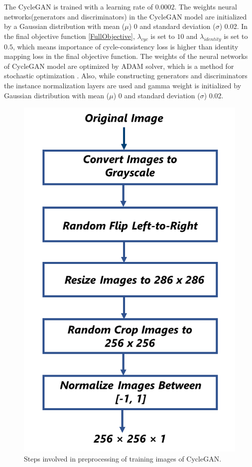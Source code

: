 The \ac{CycleGAN} is trained with a learning rate of $0.0002$. The weights neural networks(generators and discriminators) in the \ac{CycleGAN} model are initialized by a Gaussian distribution with mean ($\mu$) 0 and standard deviation ($\sigma$) 0.02. In the final objective function \ref{FullObjective}, $\lambda_{cyc}$ is set to $10$ and $\lambda_{identity}$ is set to $0.5$, which means importance of cycle-consistency loss is higher than identity mapping loss in the final objective function. The weights of the neural networks of \ac{CycleGAN} model are optimized by ADAM solver, which is a method for stochastic optimization \cite{kingma2017adam}. Also, while constructing generators and discriminators the instance normalization layers \cite{ulyanov2017instance} are used and gamma weight is initialized by Gaussian distribution with mean ($\mu$) 0 and standard deviation ($\sigma$) 0.02.


\begin{figure}[H]
        \begin{center}
	    \includegraphics[scale=0.35]{images/Implementation/Preprocessing.png}
	    \caption[Steps involved in preprocessing of training images of \ac{CycleGAN}.]{Steps involved in preprocessing of training images of \ac{CycleGAN}.}
	    \label{fig:Preprocessing}
	    \end{center}
\end{figure}


